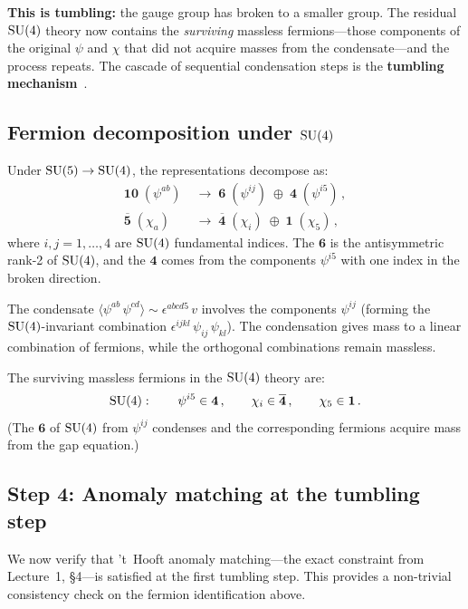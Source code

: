 \documentclass[11pt,a4paper]{article}
\begin{document}
\textbf{This is tumbling:}  the gauge group has broken to a smaller
group.  The residual $\mathrm{SU}(4)$ theory now contains the \emph{surviving}
massless fermions---those components of the original $\psi$ and $\chi$
that did not acquire masses from the condensate---and the process
repeats.  The cascade of sequential condensation steps is the
\textbf{tumbling mechanism}~\cite{RDS1980}.

\subsection{Fermion decomposition under $\mathrm{SU}(4)$}

Under $\mathrm{SU}(5) \to \mathrm{SU}(4)$, the representations decompose as:
\begin{align}
  \mathbf{10}\;(\psi^{ab}) &\;\to\;
    \mathbf{6}\;(\psi^{ij}) \;\oplus\;
    \mathbf{4}\;(\psi^{i5})\,,
    \label{eq:10-decomp} \\
  \overline{\mathbf{5}}\;(\chi_a) &\;\to\;
    \overline{\mathbf{4}}\;(\chi_i) \;\oplus\;
    \mathbf{1}\;(\chi_5)\,,
    \label{eq:5bar-decomp}
\end{align}
where $i,j = 1,\ldots,4$ are $\mathrm{SU}(4)$ fundamental indices.  The
$\mathbf{6}$ is the antisymmetric rank-2 of $\mathrm{SU}(4)$, and the
$\mathbf{4}$ comes from the components $\psi^{i5}$ with one index in
the broken direction.

The condensate $\langle \psi^{ab}\,\psi^{cd}\rangle
\sim \epsilon^{abcd5}\,v$ involves the components $\psi^{ij}$
(forming the $\mathrm{SU}(4)$-invariant combination
$\epsilon^{ijkl}\,\psi_{ij}\,\psi_{kl}$).  The condensation gives
mass to a linear combination of fermions, while the orthogonal
combinations remain massless.

The surviving massless fermions in the $\mathrm{SU}(4)$ theory are:
\begin{equation}\label{eq:SU4-content}
  \mathrm{SU}(4):\qquad
  \psi^{i5} \in \mathbf{4}\,,\qquad
  \chi_i \in \overline{\mathbf{4}}\,,\qquad
  \chi_5 \in \mathbf{1}\,.
\end{equation}
(The $\mathbf{6}$ of $\mathrm{SU}(4)$ from $\psi^{ij}$ condenses and the
corresponding fermions acquire mass from the gap equation.)

\subsection{Step 4: Anomaly matching at the tumbling step}
\label{ssec:anomaly-tumbling}

We now verify that 't~Hooft anomaly matching---the exact constraint
from Lecture~1, \S4---is satisfied at the first tumbling step.  This
provides a non-trivial consistency check on the fermion identification
above.
\end{document}
